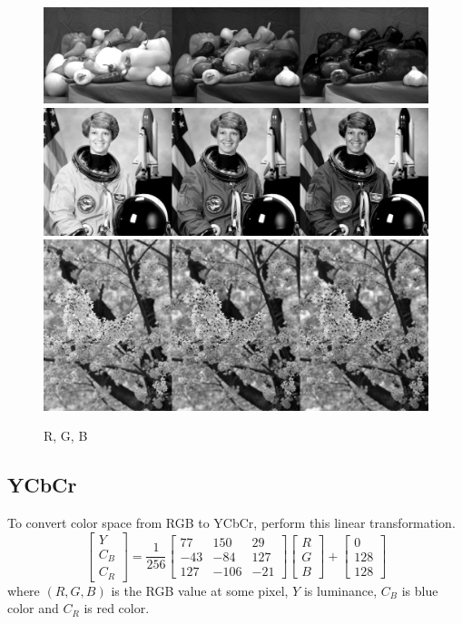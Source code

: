 \documentclass{article}
\begin{document}
\begin{figure}[h]
    \centering
    \includegraphics[width=.4\textwidth]{fig/RGB_peppers.png}\\
    \includegraphics[width=.4\textwidth]{fig/RGB_astronaut.png}\\
    \includegraphics[width=.4\textwidth]{fig/RGB_cb.png}
    \caption{R, G, B}
\end{figure}

\subsection{YCbCr}
To convert color space from RGB to YCbCr, perform this linear transformation.
$$
\begin{bmatrix}
    Y \\ C_B \\ C_R
\end{bmatrix}
=
\frac{1}{256}
\begin{bmatrix}
    77 & 150 & 29 \\
    -43 & -84 & 127 \\
    127 & -106 & -21
\end{bmatrix}
\begin{bmatrix}
    R \\ G \\ B
\end{bmatrix}
+
\begin{bmatrix}
    0 \\ 128 \\ 128
\end{bmatrix}
$$ 
where $(R, G, B)$ is the RGB value at some pixel, $Y$ is luminance, $C_B$ is blue color and $C_R$ is red color.
\end{document}
